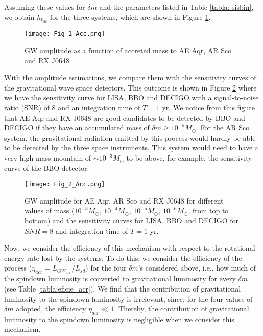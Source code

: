 \documentclass{ws-procs961x669}            %
\begin{document}
Assuming these values for $\delta m$ and the parameters listed in Table \ref{tabla: sisbin}, we obtain $h_{0_{ac}}$ for the three systems, which are shown in Figure \ref{fig:1}.

\begin{figure}
\begin{center}
\texttt{[image: Fig\_1\_Acc.png]}
\caption{GW amplitude as a function of accreted mass to AE Aqr, AR Sco and RX J0648}
\label{fig:1} 
\end{center}
\end{figure}


With the amplitude estimations, we compare them with the sensitivity curves of the gravitational wave space detectors. This outcome is shown in Figure \ref{fig:2} where we have the sensitivity curve for LISA, BBO and DECIGO with a signal-to-noise ratio (SNR) of  8 and an integration time of $T = 1$ yr. We notice from this figure that AE Aqr and RX J0648 are good candidates to be detected by BBO and DECIGO if they have an accumulated mass of  $\delta m \geq 10^{-5}M_{\odot }$. For the AR Sco system, the gravitational radiation emitted by this process would hardly be able to be detected by the three space instruments. This system would need to have a very high mass mountain of $ \sim 10^{-3}M_{\odot }$ to be above, for example, the sensitivity curve of the BBO detector.


\begin{figure}
\begin{center}
\texttt{[image: Fig\_2\_Acc.png]}
\caption{GW amplitude for AE Aqr, AR Sco and RX J0648 for different values of mass ($10^{-3}  M_{\odot}$, $10^{-4}  M_{\odot}$, $10^{-5}  M_{\odot}$, $10^{-6}  M_{\odot}$, from top to bottom) and the sensitivity curves for LISA, BBO and DECIGO for $SNR = 8$ and integration time of $T = 1$ yr.}
\label{fig:2} 
\end{center}
\end{figure}

Now, we consider the efficiency of this mechanism with respect to the rotational energy rate lost by the systems. To do this, we consider the efficiency of the process ($\eta _{acr} = L_{GW_{acr}}/L_{sd}$) for the four $\delta m$'s considered above, i.e., how much of the spindown luminosity is converted to gravitational luminosity for every $\delta m$ (see Table \ref{tabla:eficie_acr}). We find that the contribution of gravitational luminosity to the spindown luminosity is irrelevant, since, for the four values of $\delta m$ adopted, the efficiency $\eta _{acr} \ll 1$. Thereby, the contribution of gravitational luminosity to the spindown luminosity is negligible when we consider this mechanism.
\end{document}
